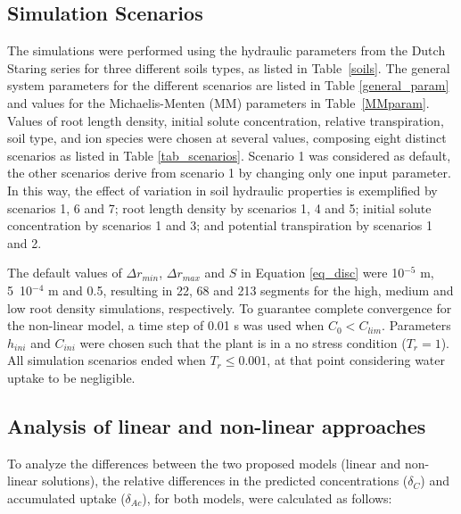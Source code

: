 \subsection*{Simulation Scenarios}

The simulations were performed using the hydraulic parameters from the Dutch Staring series \cite{wosten} for three different soils types, as listed in Table~\ref{soils}. 
The general system parameters for the different scenarios are listed in Table \ref{general_param} and values for the Michaelis-Menten (MM) parameters in Table~\ref{MMparam}. 
Values of root length density, initial solute concentration, relative transpiration, soil type, and ion species were chosen at several values, composing eight distinct scenarios as listed in Table \ref{tab_scenarios}. 
Scenario 1 was considered as default, the other scenarios derive from scenario 1 by changing only one input parameter. 
In this way, the effect of variation in soil hydraulic properties is exemplified by scenarios 1, 6 and 7; root length density by scenarios 1, 4 and 5; initial solute concentration by scenarios 1 and 3; and potential transpiration by scenarios 1 and 2.

%







The default values of $\Delta r_{min}$, $\Delta r_{max}$ and $S$ in Equation \ref{eq_disc} were 10$^{-5}$ m, 5~10$^{-4}$ m and 0.5, resulting in 22, 68 and 213 segments for the high, medium and low root density simulations, respectively.
To guarantee complete convergence for the non-linear model, a time step of 0.01 s was used when $C_0 < C_{lim}$.
Parameters $h_{ini}$ and $C_{ini}$ were chosen such that the plant is in a no stress condition ($T_r=1$).
All simulation scenarios ended when $T_r \leq 0.001$, at that point considering water uptake to be negligible.

\subsection*{Analysis of linear and non-linear approaches}

To analyze the differences between the two proposed models (linear and non-linear solutions), the relative differences in the predicted concentrations ($\delta_{C}$) and accumulated uptake ($\delta_{Ac}$), for both models, were calculated as follows:

